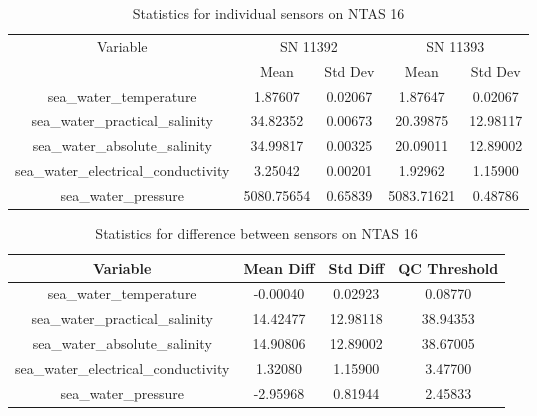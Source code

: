 \begin{table}[h]
\centering
\begin{tabular}{|c|c|c|c|c|}
\hline
Variable & \multicolumn{2}{c|}{SN 11392} & \multicolumn{2}{c|}{SN 11393} \\
& Mean & Std Dev & Mean & Std Dev \\
\hline
sea\_water\_temperature & 1.87607 & 0.02067 & 1.87647 & 0.02067 \\
sea\_water\_practical\_salinity & 34.82352 & 0.00673 & 20.39875 & 12.98117 \\
sea\_water\_absolute\_salinity & 34.99817 & 0.00325 & 20.09011 & 12.89002 \\
sea\_water\_electrical\_conductivity & 3.25042 & 0.00201 & 1.92962 & 1.15900 \\
sea\_water\_pressure & 5080.75654 & 0.65839 & 5083.71621 & 0.48786 \\
\hline
\end{tabular}
\caption{Statistics for individual sensors on NTAS 16}
\end{table}

\begin{table}[h]
\centering
\begin{tabular}{|c|c|c|c|}
\hline
Variable & Mean Diff & Std Diff & QC Threshold \\
\hline
sea\_water\_temperature & -0.00040 & 0.02923 & 0.08770 \\
sea\_water\_practical\_salinity & 14.42477 & 12.98118 & 38.94353 \\
sea\_water\_absolute\_salinity & 14.90806 & 12.89002 & 38.67005 \\
sea\_water\_electrical\_conductivity & 1.32080 & 1.15900 & 3.47700 \\
sea\_water\_pressure & -2.95968 & 0.81944 & 2.45833 \\
\hline
\end{tabular}
\caption{Statistics for difference between sensors on NTAS 16}
\end{table}
